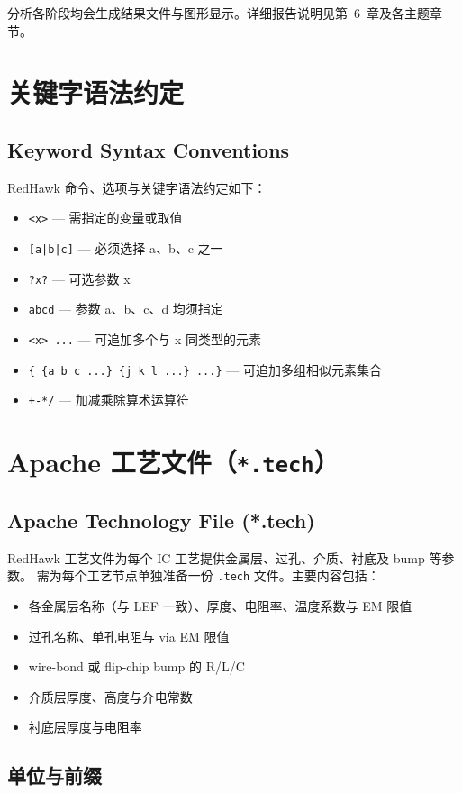 分析各阶段均会生成结果文件与图形显示。详细报告说明见第~6~章及各主题章节。

\section{关键字语法约定}
\subsection*{Keyword Syntax Conventions}

RedHawk 命令、选项与关键字语法约定如下：
\begin{itemize}
\item \texttt{<x>} — 需指定的变量或取值
\item \texttt{[a|b|c]} — 必须选择 a、b、c 之一
\item \texttt{?x?} — 可选参数 x
\item \texttt{abcd} — 参数 a、b、c、d 均须指定
\item \texttt{<x> ...} — 可追加多个与 x 同类型的元素
\item \texttt{\{ \{a b c ...\} \{j k l ...\} ...\}} — 可追加多组相似元素集合
\item \texttt{+-*/} — 加减乘除算术运算符
\end{itemize}

\section{Apache 工艺文件（\texttt{*.tech}）}
\subsection*{Apache Technology File (*.tech)}

RedHawk 工艺文件为每个 IC 工艺提供金属层、过孔、介质、衬底及 bump 等参数。
需为每个工艺节点单独准备一份 \texttt{.tech} 文件。主要内容包括：
\begin{itemize}
\item 各金属层名称（与 LEF 一致）、厚度、电阻率、温度系数与 EM 限值
\item 过孔名称、单孔电阻与 via EM 限值
\item wire-bond 或 flip-chip bump 的 R/L/C
\item 介质层厚度、高度与介电常数
\item 衬底层厚度与电阻率
\end{itemize}

\subsection{单位与前缀}
